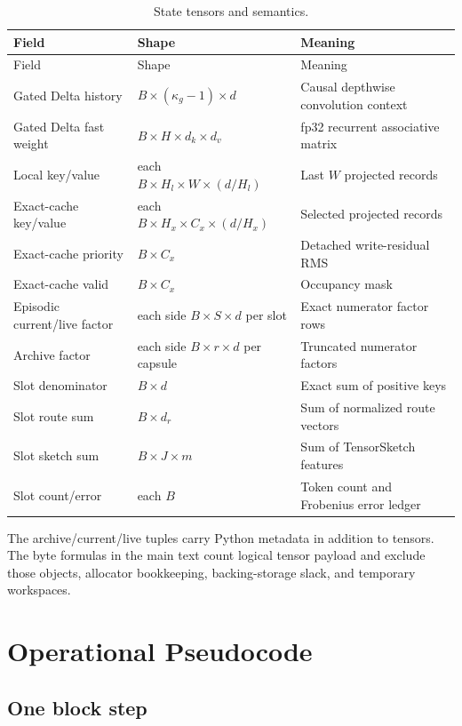 \begin{longtable}{@{}p{}p{}p{}@{}}
\caption{State tensors and semantics.}
\label{tab:state-shapes}\\
\toprule
Field & Shape & Meaning \\
\midrule
\endfirsthead
\toprule
Field & Shape & Meaning \\
\midrule
\endhead
Gated Delta history & \(B\times(\kappa_g-1)\times d\) & Causal depthwise
convolution context \\
Gated Delta fast weight & \(B\times H\times d_k\times d_v\) & fp32 recurrent
associative matrix \\
Local key/value & each \(B\times H_l\times W\times(d/H_l)\) & Last \(W\)
projected records \\
Exact-cache key/value & each \(B\times H_x\times C_x\times(d/H_x)\) &
Selected projected records \\
Exact-cache priority & \(B\times C_x\) & Detached write-residual RMS \\
Exact-cache valid & \(B\times C_x\) & Occupancy mask \\
Episodic current/live factor & each side
\(B\times S\times d\) per slot & Exact numerator factor rows \\
Archive factor & each side \(B\times r\times d\) per capsule & Truncated
numerator factors \\
Slot denominator & \(B\times d\) & Exact sum of positive keys \\
Slot route sum & \(B\times d_r\) & Sum of normalized route vectors \\
Slot sketch sum & \(B\times J\times m\) & Sum of TensorSketch features \\
Slot count/error & each \(B\) & Token count and Frobenius error ledger \\
\bottomrule
\end{longtable}

The archive/current/live tuples carry Python metadata in addition to tensors.
The byte formulas in the main text count logical tensor payload and exclude
those objects, allocator bookkeeping, backing-storage slack, and temporary
workspaces.

\section{Operational Pseudocode}
\label{app:pseudocode}

\subsection{One block step}

